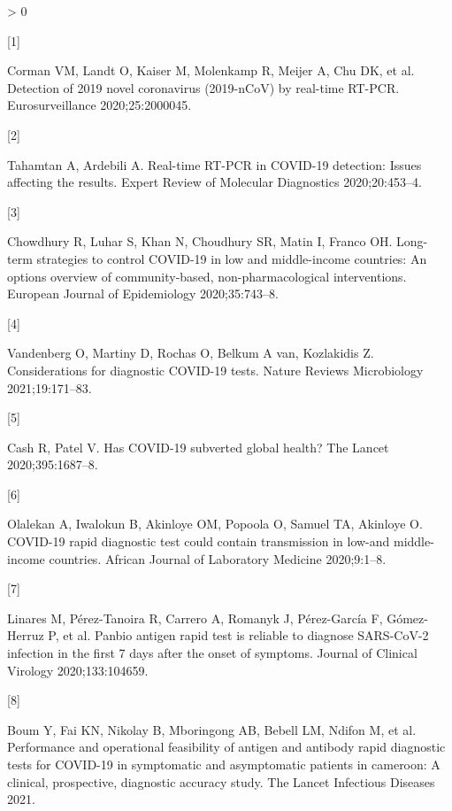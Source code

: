 \documentclass[]{elsarticle} %
\newlength{\cslhangindent}
\newlength{\csllabelwidth}
\newenvironment{CSLReferences}[2] %
 {%
  \setlength{\parindent}{0pt}
  \ifodd #1 \everypar{\setlength{\hangindent}{\cslhangindent}}\ignorespaces\fi
  \ifnum #2 > 0
  \setlength{\parskip}{#2\baselineskip}
  \fi
 }%
 {}
\newcommand{\CSLLeftMargin}[1]{\parbox[t]{\csllabelwidth}{#1}}
\newcommand{\CSLRightInline}[1]{\parbox[t]{\linewidth - \csllabelwidth}{#1}\break}
\begin{document}
\hypertarget{refs}{}
\begin{CSLReferences}{0}{0}
\leavevmode\hypertarget{ref-corman2020detection}{}%
\CSLLeftMargin{{[}1{]} }
\CSLRightInline{Corman VM, Landt O, Kaiser M, Molenkamp R, Meijer A, Chu DK, et al. Detection of 2019 novel coronavirus (2019-nCoV) by real-time RT-PCR. Eurosurveillance 2020;25:2000045.}

\leavevmode\hypertarget{ref-tahamtan2020real}{}%
\CSLLeftMargin{{[}2{]} }
\CSLRightInline{Tahamtan A, Ardebili A. Real-time RT-PCR in COVID-19 detection: Issues affecting the results. Expert Review of Molecular Diagnostics 2020;20:453--4.}

\leavevmode\hypertarget{ref-chowdhury2020long}{}%
\CSLLeftMargin{{[}3{]} }
\CSLRightInline{Chowdhury R, Luhar S, Khan N, Choudhury SR, Matin I, Franco OH. Long-term strategies to control COVID-19 in low and middle-income countries: An options overview of community-based, non-pharmacological interventions. European Journal of Epidemiology 2020;35:743--8.}

\leavevmode\hypertarget{ref-vandenberg2021considerations}{}%
\CSLLeftMargin{{[}4{]} }
\CSLRightInline{Vandenberg O, Martiny D, Rochas O, Belkum A van, Kozlakidis Z. Considerations for diagnostic COVID-19 tests. Nature Reviews Microbiology 2021;19:171--83.}

\leavevmode\hypertarget{ref-cash2020has}{}%
\CSLLeftMargin{{[}5{]} }
\CSLRightInline{Cash R, Patel V. Has COVID-19 subverted global health? The Lancet 2020;395:1687--8.}

\leavevmode\hypertarget{ref-olalekan2020covid}{}%
\CSLLeftMargin{{[}6{]} }
\CSLRightInline{Olalekan A, Iwalokun B, Akinloye OM, Popoola O, Samuel TA, Akinloye O. COVID-19 rapid diagnostic test could contain transmission in low-and middle-income countries. African Journal of Laboratory Medicine 2020;9:1--8.}

\leavevmode\hypertarget{ref-linares2020panbio}{}%
\CSLLeftMargin{{[}7{]} }
\CSLRightInline{Linares M, Pérez-Tanoira R, Carrero A, Romanyk J, Pérez-García F, Gómez-Herruz P, et al. Panbio antigen rapid test is reliable to diagnose SARS-CoV-2 infection in the first 7 days after the onset of symptoms. Journal of Clinical Virology 2020;133:104659.}

\leavevmode\hypertarget{ref-boum2021performance}{}%
\CSLLeftMargin{{[}8{]} }
\CSLRightInline{Boum Y, Fai KN, Nikolay B, Mboringong AB, Bebell LM, Ndifon M, et al. Performance and operational feasibility of antigen and antibody rapid diagnostic tests for COVID-19 in symptomatic and asymptomatic patients in cameroon: A clinical, prospective, diagnostic accuracy study. The Lancet Infectious Diseases 2021.}


\end{CSLReferences}
\end{document}
